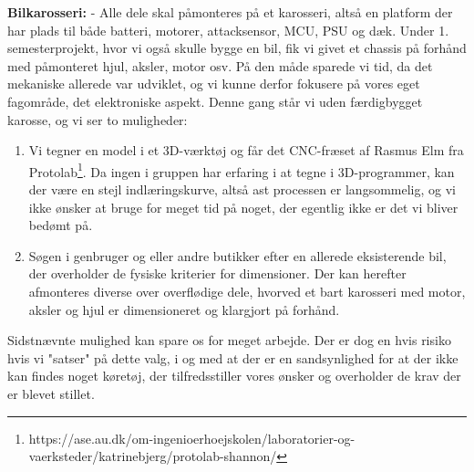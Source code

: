 \textbf{Bilkarosseri:}
- Alle dele skal påmonteres på et karosseri, altså en platform der har plads til både batteri, motorer, attacksensor, MCU, PSU og dæk.
Under 1. semesterprojekt, hvor vi også skulle bygge en bil, fik vi givet et chassis på forhånd med påmonteret hjul, aksler, motor osv. På den måde sparede vi tid, da det mekaniske allerede var udviklet, og vi kunne derfor fokusere på vores eget fagområde, det elektroniske aspekt.
Denne gang står vi uden færdigbygget karosse, og vi ser to muligheder:
\begin{enumerate}
    \item Vi tegner en model i et 3D-værktøj og får det CNC-fræset af Rasmus Elm fra Protolab\footnote{https://ase.au.dk/om-ingenioerhoejskolen/laboratorier-og-vaerksteder/katrinebjerg/protolab-shannon/}. Da ingen i gruppen har erfaring i at tegne i 3D-programmer, kan der være en stejl indlæringskurve, altså ast processen er langsommelig, og vi ikke ønsker at bruge for meget tid på noget, der egentlig ikke er det vi bliver bedømt på. %
\item Søgen i genbruger og eller andre butikker efter en allerede eksisterende bil, der overholder de fysiske kriterier for dimensioner. Der kan herefter afmonteres diverse over overflødige dele, hvorved et bart karosseri med motor, aksler og hjul er dimensioneret og klargjort på forhånd.
\end{enumerate}
Sidstnævnte mulighed kan spare os for meget arbejde. Der er dog en hvis risiko hvis vi "satser" på dette valg, i og med at der er en sandsynlighed for at der ikke kan findes noget køretøj, der tilfredsstiller vores ønsker og overholder de krav der er blevet stillet.


